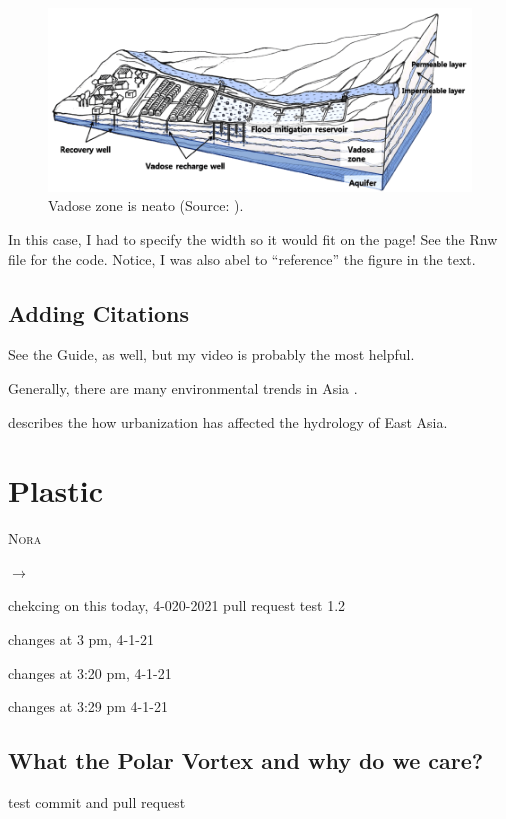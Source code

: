 \documentclass{book}\usepackage{knitr}
\makeatletter
\newcommand{\chapterauthor}[1]{%
  {\parindent0pt\vspace*{-25pt}%
  \linespread{1.1}\large\scshape#1%
  \par\nobreak\vspace*{35pt}}
  \@afterheading%
}
\makeatother
\begin{document}
\begin{knitrout}
\begin{kframe}
\begin{figure}
\includegraphics[width=\linewidth]{images/Lee-Vadose}
\caption{Vadose zone is neato (Source: \citet{lee2017fifty}).}
\label{fig:vadose}
\end{figure}

In this case, I had to specify the width so it would fit on the page!  See the Rnw file for the code. Notice, I was also abel to ``reference'' the figure in the text.

\section{Adding Citations}

See the Guide, as well, but my video is probably the most helpful.


Generally, there are many environmental trends in Asia \citep{imura2005urban}.

\citet{imura2005urban} describes the how urbanization has affected the hydrology of East Asia. 
 

\chapter{Plastic}

\chapterauthor{Nora}

$\rightarrow$

chekcing on this today, 4-020-2021
pull request test 1.2 

changes at 3 pm, 4-1-21

changes at 3:20 pm, 4-1-21

changes at 3:29 pm 4-1-21



\section{What the Polar Vortex and why do we care?}

test commit and pull request 



\end{kframe}
\end{knitrout}
\end{document}
